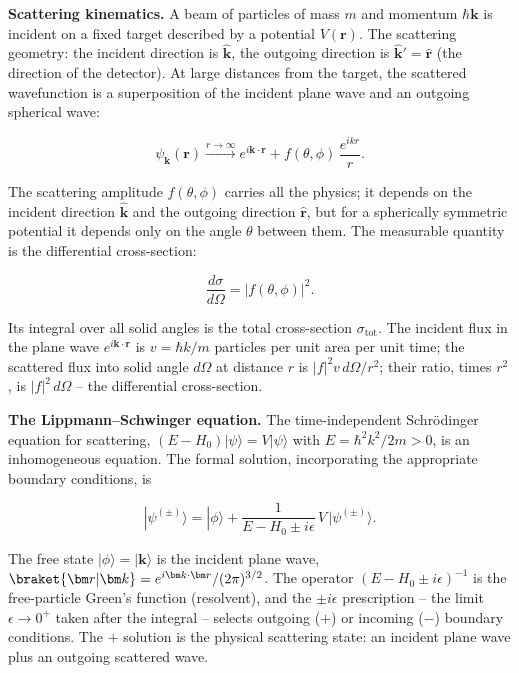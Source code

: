 \medskip\noindent\textbf{Scattering kinematics.}
A beam of particles of mass $m$ and momentum $\hbar\bm k$ is incident on a fixed target described by a potential $V(\bm r)$. The scattering geometry: the incident direction is $\hat{\bm k}$, the outgoing direction is $\hat{\bm k}' = \hat{\bm r}$ (the direction of the detector). At large distances from the target, the scattered wavefunction is a superposition of the incident plane wave and an outgoing spherical wave:
\begin{linenomath}
\begin{equation}
\psi_{\bm k}(\bm r) \xrightarrow{r\to\infty} e^{i\bm k\cdot\bm r} + f(\theta,\phi)\,\frac{e^{ikr}}{r}.
\label{eq:scattering-amplitude-def}
\end{equation}
\end{linenomath}
The scattering amplitude $f(\theta,\phi)$ carries all the physics; it depends on the incident direction $\hat{\bm k}$ and the outgoing direction $\hat{\bm r}$, but for a spherically symmetric potential it depends only on the angle $\theta$ between them. The measurable quantity is the differential cross-section:
\begin{linenomath}
\begin{equation*}
\frac{d\sigma}{d\Omega} = |f(\theta,\phi)|^{2}.
\end{equation*}
\end{linenomath}
Its integral over all solid angles is the total cross-section $\sigma_{\text{tot}}$. The incident flux in the plane wave $e^{i\bm k\cdot\bm r}$ is $v = \hbar k/m$ particles per unit area per unit time; the scattered flux into solid angle $d\Omega$ at distance $r$ is $|f|^{2}v\,d\Omega/r^{2}$; their ratio, times $r^{2}$, is $|f|^{2}\,d\Omega$ -- the differential cross-section.

\medskip\noindent\textbf{The Lippmann--Schwinger equation.}
The time-independent Schr\"odinger equation for scattering, $(E-H_{0})|\psi\rangle = V|\psi\rangle$ with $E = \hbar^{2}k^{2}/2m > 0$, is an inhomogeneous equation. The formal solution, incorporating the appropriate boundary conditions, is
\begin{linenomath}
\begin{equation}
|\psi^{(\pm)}\rangle = |\phi\rangle + \frac{1}{E - H_{0} \pm i\epsilon}\,V\,|\psi^{(\pm)}\rangle.
\label{eq:lippmann-schwinger}
\end{equation}
\end{linenomath}
The free state $|\phi\rangle = |\bm k\rangle$ is the incident plane wave, $\braket{\bm r|\bm k} = e^{i\bm k\cdot\bm r}/(2\pi)^{3/2}$. The operator $(E-H_{0}\pm i\epsilon)^{-1}$ is the free-particle Green's function (resolvent), and the $\pm i\epsilon$ prescription -- the limit $\epsilon \to 0^{+}$ taken after the integral -- selects outgoing ($+$) or incoming ($-$) boundary conditions. The $+$ solution is the physical scattering state: an incident plane wave plus an outgoing scattered wave.

